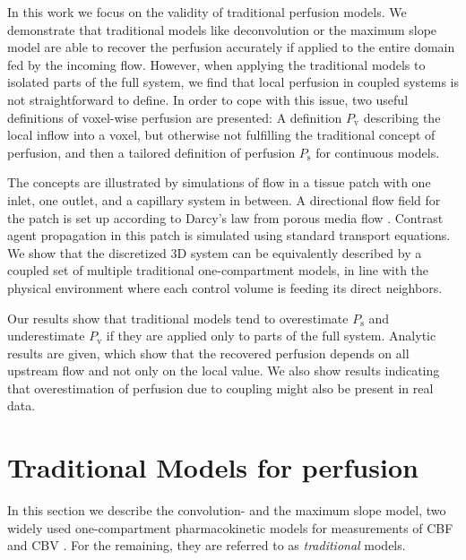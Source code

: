 \documentclass[journal,twocolumn]{IEEEtran}
\newcommand{\Perfv}{P_{\mathrm{v}}}
\newcommand{\Perfs}{P_{\mathrm{s}}}
\begin{document}
	
	In this work we focus on the validity of traditional perfusion models.
	We  demonstrate that traditional models like deconvolution or the maximum slope model are able to recover the perfusion accurately if applied to the entire domain fed by the incoming flow.
	However, when applying the traditional models to isolated parts of the full system, we find that local perfusion in coupled systems is not straightforward to define.
	In order to cope with this issue, two useful definitions of voxel-wise perfusion are presented: A definition $\Perfv$ describing the local inflow into a voxel, but otherwise not fulfilling the traditional concept of perfusion, and then a tailored definition of perfusion $\Perfs$ for continuous models.
	
The concepts are illustrated by simulations of flow in a tissue patch with one inlet, one outlet, and a capillary system in between.
	A directional flow field for the patch is set up according to Darcy's law from porous media flow \cite{Darcy56}.
	Contrast agent propagation in this patch is simulated using standard transport equations.
	We show that the discretized 3D system can be equivalently described by a coupled set of multiple traditional one-compartment models, in line with the physical environment where each control volume is feeding its direct neighbors.

	
	Our results show that traditional models tend to overestimate $\Perfs$ and underestimate $\Perfv$ if they are applied only to parts of the full system.
	Analytic results are given, which show that the recovered perfusion depends on all upstream flow and not only on the local value.
	We also show results indicating that overestimation of perfusion due to coupling might also be present in real data.
	
	
	
	\section{Traditional Models for perfusion} \label{sec:traditional}

	In this section we describe the convolution- and the maximum slope model, two widely used one-compartment pharmacokinetic models for measurements of CBF and CBV \cite{Feng2013,Chen2011,kudo10}.
	For the remaining, they are referred to as \emph{traditional} models.
	
\end{document}
